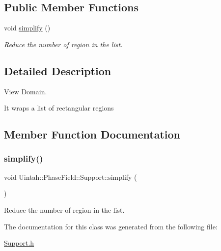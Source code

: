 \subsection*{Public Member Functions}
\begin{DoxyCompactItemize}
\item 
void \hyperlink{classUintah_1_1PhaseField_1_1Support_a45945114391bc24d719afe3887f78b7c}{simplify} ()
\begin{DoxyCompactList}\small\item\em Reduce the number of region in the list. \end{DoxyCompactList}\end{DoxyCompactItemize}


\subsection{Detailed Description}
View Domain. 

It wraps a list of rectangular regions 

\subsection{Member Function Documentation}
\mbox{\label{classUintah_1_1PhaseField_1_1Support_a45945114391bc24d719afe3887f78b7c}} 
\subsubsection{\texorpdfstring{simplify()}{simplify()}}
{\footnotesize\ttfamily void Uintah\+::\+Phase\+Field\+::\+Support\+::simplify (\begin{DoxyParamCaption}{ }\end{DoxyParamCaption})\hspace{0.3cm}{\ttfamily [inline]}}



Reduce the number of region in the list. 



The documentation for this class was generated from the following file\+:\begin{DoxyCompactItemize}
\item 
\hyperlink{Support_8h}{Support.\+h}\end{DoxyCompactItemize}
